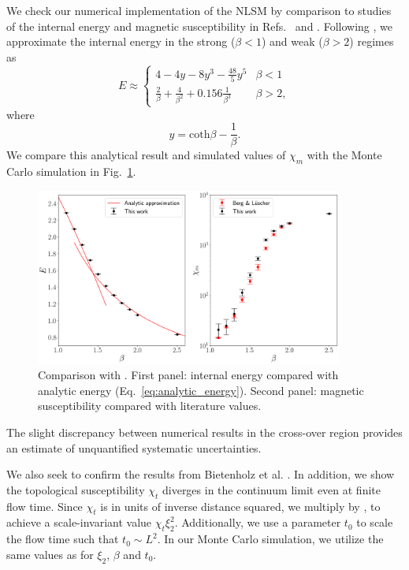 \documentclass[a4paper,11pt]{article}
\begin{document}
We check our numerical implementation of the NLSM by comparison to studies of the internal energy and magnetic susceptibility in Refs.~\cite{berg1981} and \cite{bietenholz2018}. Following \cite{berg1981}, we approximate the internal energy in the strong ($\beta<1$) and weak ($\beta>2$) regimes as
\begin{equation}
    \label{eq:analytic_energy}
E \approx \begin{cases}
    4-4y-8y^3-\frac{48}{5}y^5& \beta<1 \\
\frac{2}{\beta} + \frac{4}{\beta^2} + 0.156\frac{1}{\beta^3}& \beta>2,
\end{cases}
\end{equation}
where
\begin{equation}
    y=\mathrm{coth}\beta-\frac{1}{\beta}.
\end{equation}
We compare this analytical result and simulated values of $\chi_m$ with the Monte Carlo simulation in Fig.~\ref{fig:bergluscher}.
\begin{figure}[h!]
    \centering
      \includegraphics[width=0.9\textwidth]{berg_luscher.png}
      \caption{\label{fig:bergluscher} Comparison with \cite{berg1981}. First panel: internal energy compared with analytic  energy (Eq.~\ref{eq:analytic_energy}). Second panel: magnetic susceptibility compared with literature values.}
\end{figure}
The slight discrepancy between numerical results in the cross-over region provides an estimate of unquantified systematic uncertainties.

We also seek to confirm the results from Bietenholz et al. \cite{bietenholz2018}. In addition, we show the topological susceptibility $\chi_t$ diverges in the continuum limit even at finite flow time. Since $\chi_t$ is in units of inverse distance squared, we multiply by , to achieve a scale-invariant value $\chi_t\xi_2^2$. Additionally, we use a parameter $t_0$ to scale the flow time such that $t_0\sim L^2$. In our Monte Carlo simulation, we utilize the same values as \cite{bietenholz2018} for $\xi_2$, $\beta$ and $t_0$.
\end{document}
